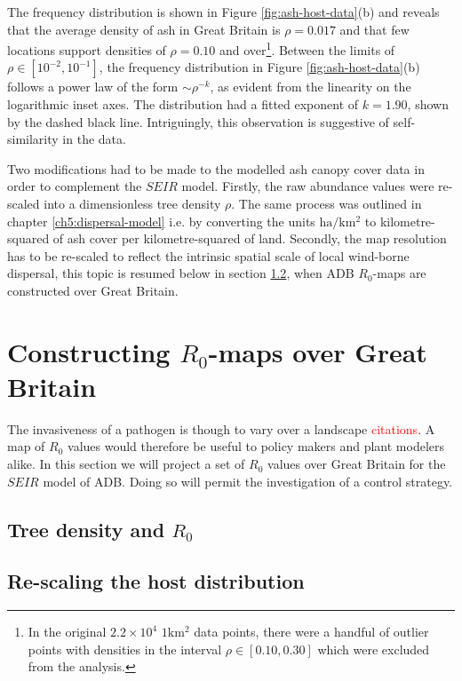  The frequency distribution is shown in Figure \ref{fig:ash-host-data}(b) and reveals that the average density of ash in Great Britain is $\rho=0.017$ and that few locations support densities of $\rho=0.10$ and over\footnote{In the original $2.2\times 10^4$ $1\mathrm{km^2}$ data points, there were a handful of outlier points with densities in the interval $\rho \in [0.10, 0.30]$ which were excluded from the analysis.}. Between the limits of $\rho \in [10^{-2}, 10^{-1}]$, the frequency distribution in Figure \ref{fig:ash-host-data}(b) follows a power law of the form $\sim \rho ^{-k}$, as evident from the linearity on the logarithmic inset axes. The distribution had a fitted exponent of $k=1.90$, shown by the dashed black line. Intriguingly, this observation is suggestive of self-similarity in the data.

Two modifications had to be made to the modelled ash canopy cover data in order to complement the $SEIR$ model. Firstly, the raw abundance values were re-scaled into a dimensionless tree density $\rho$. The same process was outlined in chapter \ref{ch5:dispersal-model} i.e. by converting the units $\mathrm{ha/km^2}$ to kilometre-squared of ash cover per kilometre-squared of land. Secondly, the map resolution has to be re-scaled to reflect the intrinsic spatial scale of local wind-borne dispersal, this topic is resumed below in section \ref{ch6:re-scaling-host-data}, when ADB $R_0$-maps are constructed over Great Britain.

\section{Constructing $R_0$-maps over Great Britain}

The invasiveness of a pathogen is though to vary over a landscape \textcolor{red}{citations}. A map of $R_0$ values would therefore be useful to policy makers and plant modelers alike. In this section we will project a set of $R_0$ values over Great Britain for the $SEIR$ model of ADB. Doing so will permit the investigation of a control strategy. 

\subsection{Tree density and $R_0$}
\blindtext

\subsection{Re-scaling the host distribution}
\label{ch6:re-scaling-host-data}

